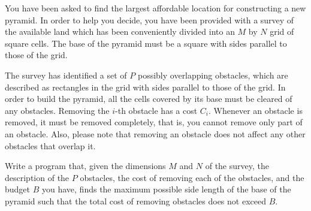 You have been asked to find the largest affordable location for constructing a new pyramid.  In order to help you decide, you have been provided with a survey of the available land which has been conveniently divided into an $M$ by $N$ grid of square cells. The base of the pyramid must be a square with sides parallel
to those of the grid.

The survey has identified a set of $P$ possibly overlapping obstacles, which are described as rectangles in the grid with sides parallel to those of the grid. In order to build the pyramid, all the cells covered by its base must be cleared of any obstacles. Removing the $i$-th obstacle has a cost $C_i$. Whenever an obstacle is
removed, it must be removed completely, that is, you cannot remove only part of an obstacle. Also, please note that removing an obstacle does not affect any other obstacles that overlap it.

Write a program that, given the dimensions $M$ and $N$ of the survey, the description of the $P$ obstacles, the cost of removing each of the obstacles, and the budget $B$ you have, finds the maximum possible side length of the base of the pyramid such that the total cost of removing obstacles does not exceed $B$.
